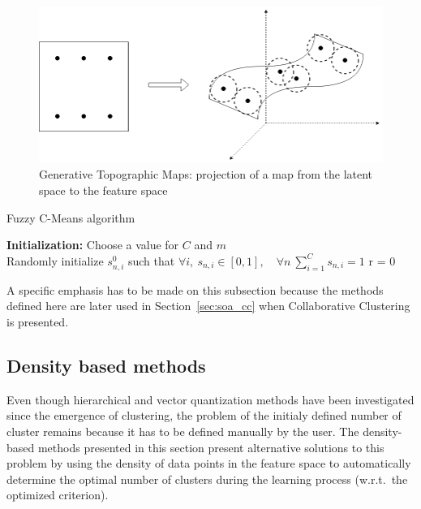 \documentclass[a4paper]{report}
\begin{document}
        \vspace{0.8cm}
   
        \begin{figure}[h]
            \centering
            \includegraphics[scale=.3]{gtm}
            \caption{Generative Topographic Maps: projection of a map from the latent space to the feature space}
\label{fig:gtm}
        \end{figure}

    \begin{algorithm}
        \caption{Fuzzy C-Means algorithm}
\label{alg:fcm}
    \textbf{Initialization:} Choose a value for $C$ and $m$\\
    Randomly initialize $s^0_{n,i}$ such that $\forall i, ~ s_{n,i} \in [0,1], \quad \forall n ~ \sum\limits_{i=1}^C s_{n,i} = 1$
    r = 0
\end{algorithm}

A specific emphasis has to be made on this subsection because the methods defined here are later used in Section~\ref{sec:soa_cc} when Collaborative Clustering is presented.

\subsection{Density based methods}

Even though hierarchical and vector quantization methods have been investigated since the emergence of clustering, the problem of the initialy defined number of cluster remains because it has to be defined manually by the user. The density-based methods presented in this section present alternative solutions to this problem by using the density of data points in the feature space to automatically determine the optimal number of clusters during the learning process (w.r.t.\ the optimized criterion). 
\end{document}
